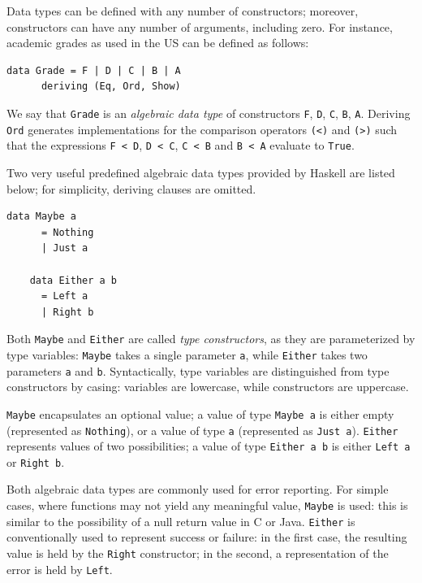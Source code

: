 \documentclass[UdineBachThesis,american,11pt]{PhdThesis}
\begin{document}
  Data types can be defined with any number of constructors; moreover,
  constructors can have any number of arguments, including zero. For instance,
  academic grades as used in the US can be defined as follows:

  \begin{Verbatim}[gobble=4,fontsize=\small]
    data Grade = F | D | C | B | A
      deriving (Eq, Ord, Show)
  \end{Verbatim}

  We say that \mbox{\texttt{Grade}} is an \emph{algebraic data type} of
  constructors \texttt{F}, \texttt{D}, \texttt{C}, \texttt{B}, \texttt{A}.
  Deriving \mbox{\texttt{Ord}} generates implementations for the comparison
  operators \mbox{\texttt{(<)}} and \mbox{\texttt{(>)}} such that the
  expressions \mbox{\texttt{F < D}}, \mbox{\texttt{D < C}},
  \mbox{\texttt{C < B}} and \mbox{\texttt{B < A}} evaluate to
  \mbox{\texttt{True}}.

  Two very useful predefined algebraic data types provided by Haskell are listed
  below; for simplicity, deriving clauses are omitted.

  \begin{Verbatim}[gobble=4,fontsize=\small]
    data Maybe a
      = Nothing
      | Just a

    data Either a b
      = Left a
      | Right b
  \end{Verbatim}

  Both \mbox{\texttt{Maybe}} and \mbox{\texttt{Either}} are called \emph{type
  constructors}, as they are parameterized by type variables:
  \mbox{\texttt{Maybe}} takes a single parameter \texttt{a}, while
  \mbox{\texttt{Either}} takes two parameters \texttt{a} and \texttt{b}.
  Syntactically, type variables are distinguished from type constructors by
  casing: variables are lowercase, while constructors are uppercase.

  \mbox{\texttt{Maybe}} encapsulates an optional value; a value of type
  \mbox{\texttt{Maybe a}} is either empty (represented as
  \mbox{\texttt{Nothing}}), or a value of type \texttt{a} (represented as
  \mbox{\texttt{Just a}}). \mbox{\texttt{Either}} represents values of two
  possibilities; a value of type \mbox{\texttt{Either a b}} is either
  \mbox{\texttt{Left a}} or \mbox{\texttt{Right b}}.

  \pagebreak

  Both algebraic data types are commonly used for error reporting. For simple
  cases, where functions may not yield any meaningful value,
  \mbox{\texttt{Maybe}} is used: this is similar to the possibility of a null
  return value in C or Java. \mbox{\texttt{Either}} is conventionally used to
  represent success or failure: in the first case, the resulting value is held
  by the \mbox{\texttt{Right}} constructor; in the second, a representation of
  the error is held by \mbox{\texttt{Left}}.
\end{document}
